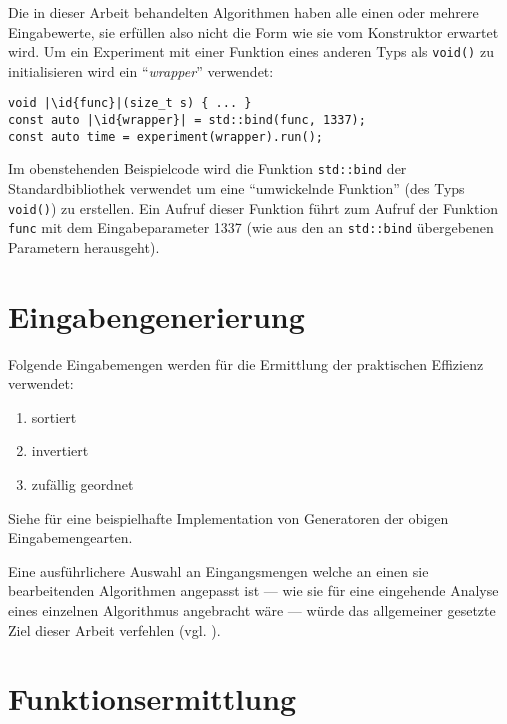 Die in dieser Arbeit behandelten Algorithmen haben alle einen oder mehrere Eingabewerte, sie erfüllen also nicht die Form wie sie vom Konstruktor erwartet wird. Um ein Experiment mit einer Funktion eines anderen Typs als \lstinline{void()} zu initialisieren wird ein \enquote{\emph{wrapper}} verwendet:

\begin{lstlisting}[numbers=none]
void |\id{func}|(size_t s) { ... }
const auto |\id{wrapper}| = std::bind(func, 1337);
const auto time = experiment(wrapper).run();
\end{lstlisting}

Im obenstehenden Beispielcode wird die Funktion \lstinline{std::bind} der Standardbibliothek verwendet um eine \enquote{umwickelnde Funktion} (des Typs \lstinline{void()}) zu erstellen. Ein Aufruf dieser Funktion führt zum Aufruf der Funktion \lstinline{func} mit dem Eingabeparameter 1337 (wie aus den an \lstinline{std::bind} übergebenen Parametern herausgeht).

\section{Eingabengenerierung}
\label{sec:eingabengen}


Folgende Eingabemengen werden für die Ermittlung der praktischen Effizienz verwendet:

\begin{enumerate}
    \item sortiert
    \item invertiert
    \item zufällig geordnet
\end{enumerate}

Siehe  für eine beispielhafte Implementation von Generatoren der obigen Eingabemengearten.

Eine ausführlichere Auswahl an Eingangsmengen welche an einen sie bearbeitenden Algorithmen angepasst ist --- wie sie für eine eingehende Analyse eines einzelnen Algorithmus angebracht wäre --- würde das allgemeiner gesetzte Ziel dieser Arbeit verfehlen (vgl. \cite[27ff]{mcg2012}).

\section{Funktionsermittlung}
\label{sec:funkterm}

